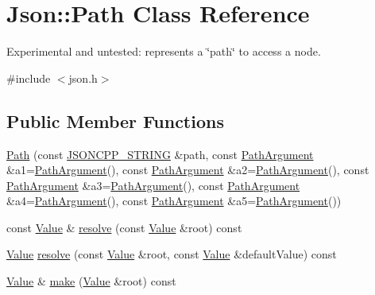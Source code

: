 \hypertarget{classJson_1_1Path}{}\section{Json\+:\+:Path Class Reference}
\label{classJson_1_1Path}


Experimental and untested\+: represents a \char`\"{}path\char`\"{} to access a node.  




{\ttfamily \#include $<$json.\+h$>$}

\subsection*{Public Member Functions}
\begin{DoxyCompactItemize}
\item 
\hyperlink{classJson_1_1Path_a7356c0e9c1fc2276390fd396271c1300_a7356c0e9c1fc2276390fd396271c1300}{Path} (const \hyperlink{json_8h_a1e723f95759de062585bc4a8fd3fa4be_a1e723f95759de062585bc4a8fd3fa4be}{J\+S\+O\+N\+C\+P\+P\+\_\+\+S\+T\+R\+I\+NG} \&path, const \hyperlink{classJson_1_1PathArgument}{Path\+Argument} \&a1=\hyperlink{classJson_1_1PathArgument}{Path\+Argument}(), const \hyperlink{classJson_1_1PathArgument}{Path\+Argument} \&a2=\hyperlink{classJson_1_1PathArgument}{Path\+Argument}(), const \hyperlink{classJson_1_1PathArgument}{Path\+Argument} \&a3=\hyperlink{classJson_1_1PathArgument}{Path\+Argument}(), const \hyperlink{classJson_1_1PathArgument}{Path\+Argument} \&a4=\hyperlink{classJson_1_1PathArgument}{Path\+Argument}(), const \hyperlink{classJson_1_1PathArgument}{Path\+Argument} \&a5=\hyperlink{classJson_1_1PathArgument}{Path\+Argument}())
\item 
const \hyperlink{classJson_1_1Value}{Value} \& \hyperlink{classJson_1_1Path_ad1abdc54d2e03fc0e9436c3b9fd55a33_ad1abdc54d2e03fc0e9436c3b9fd55a33}{resolve} (const \hyperlink{classJson_1_1Value}{Value} \&root) const
\item 
\hyperlink{classJson_1_1Value}{Value} \hyperlink{classJson_1_1Path_ab65ab001ccdbc6f8b5f123da58b92539_ab65ab001ccdbc6f8b5f123da58b92539}{resolve} (const \hyperlink{classJson_1_1Value}{Value} \&root, const \hyperlink{classJson_1_1Value}{Value} \&default\+Value) const
\item 
\hyperlink{classJson_1_1Value}{Value} \& \hyperlink{classJson_1_1Path_a858f9426f0f7bbe0450644d72b44e26b_a858f9426f0f7bbe0450644d72b44e26b}{make} (\hyperlink{classJson_1_1Value}{Value} \&root) const
\end{DoxyCompactItemize}
